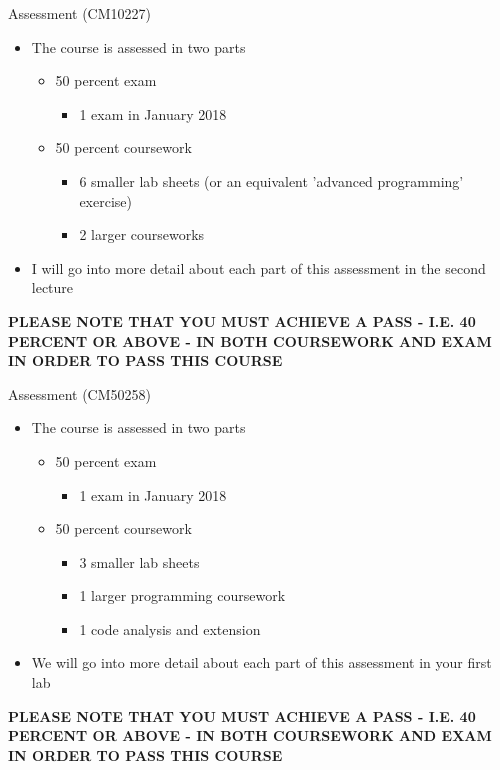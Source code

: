 \documentclass{beamer}
\begin{document}
\begin{frame}

Assessment (CM10227)

\begin{itemize}
\item The course is assessed in two parts

\begin{itemize}
\item 50 percent exam

\begin{itemize}
\item 1 exam in January 2018
\end{itemize}
\item 50 percent coursework

\begin{itemize}
\item 6 smaller lab sheets (or an equivalent 'advanced programming' exercise)
\item 2 larger courseworks
\end{itemize}
\end{itemize}
\item I will go into more detail about each part of this assessment in the second lecture
\end{itemize}

\bigskip
\textbf{PLEASE NOTE THAT YOU MUST ACHIEVE A PASS - I.E. 40 PERCENT OR ABOVE - IN BOTH COURSEWORK AND EXAM IN ORDER TO PASS THIS COURSE}

\end{frame} 
\begin{frame}

Assessment (CM50258)

\begin{itemize}
\item The course is assessed in two parts

\begin{itemize}
\item 50 percent exam

\begin{itemize}
\item 1 exam in January 2018
\end{itemize}
\item 50 percent coursework

\begin{itemize}
\item 3 smaller lab sheets
\item 1 larger programming coursework
\item 1 code analysis and extension
\end{itemize}
\end{itemize}
\item We will go into more detail about each part of this assessment in your first lab
\end{itemize}

\bigskip
\textbf{PLEASE NOTE THAT YOU MUST ACHIEVE A PASS - I.E. 40 PERCENT OR ABOVE - IN BOTH COURSEWORK AND EXAM IN ORDER TO PASS THIS COURSE}

\end{frame} 
\end{document}
